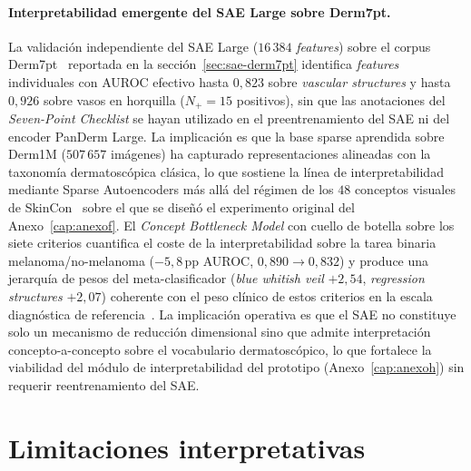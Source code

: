 \paragraph{Interpretabilidad emergente del SAE Large sobre
Derm7pt.}
La validación independiente del SAE Large
($16\,384$ \emph{features}) sobre el corpus
Derm7pt~\cite{kawahara2019} reportada en la
secci\'on~\ref{sec:sae-derm7pt} identifica \emph{features}
individuales con AUROC efectivo hasta $0{,}823$ sobre
\emph{vascular structures} y hasta $0{,}926$ sobre
vasos en horquilla ($N_{+} = 15$ positivos), sin que las
anotaciones del \emph{Seven-Point Checklist} se hayan utilizado
en el preentrenamiento del SAE ni del encoder PanDerm Large.
La implicación es que la base sparse aprendida sobre Derm1M
($507\,657$ imágenes) ha capturado representaciones alineadas
con la taxonomía dermatoscópica clásica, lo que sostiene la
línea de interpretabilidad mediante Sparse Autoencoders más allá
del régimen de los $48$ conceptos visuales de
SkinCon~\cite{skincon} sobre el que se diseñó el experimento
original del Anexo~\ref{cap:anexof}. El \emph{Concept Bottleneck
Model} con cuello de botella sobre los siete criterios cuantifica
el coste de la interpretabilidad sobre la tarea binaria
melanoma/no-melanoma ($-5{,}8$\,pp AUROC, $0{,}890 \to 0{,}832$)
y produce una jerarquía de pesos del meta-clasificador
(\emph{blue whitish veil} $+2{,}54$, \emph{regression
structures} $+2{,}07$) coherente con el peso clínico de
estos criterios en la escala diagnóstica de
referencia~\cite{kawahara2019}. La implicación operativa es que el
SAE no constituye solo un mecanismo de reducción dimensional sino
que admite interpretación concepto-a-concepto sobre el vocabulario
dermatoscópico, lo que fortalece la viabilidad del módulo de
interpretabilidad del prototipo (Anexo~\ref{cap:anexoh}) sin
requerir reentrenamiento del SAE.

\section{Limitaciones interpretativas}
\label{sec:disc-limitaciones}

